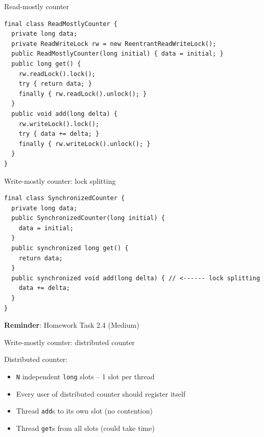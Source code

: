 \begin{frame}[fragile]{Read-mostly counter}

\begin{verbatim}
final class ReadMostlyCounter {
  private long data;
  private ReadWriteLock rw = new ReentrantReadWriteLock();
  public ReadMostlyCounter(long initial) { data = initial; }
  public long get() { 
    rw.readLock().lock();
    try { return data; } 
    finally { rw.readLock().unlock(); }
  }
  public void add(long delta) { 
    rw.writeLock().lock();
    try { data += delta; } 
    finally { rw.writeLock().unlock(); }
  }
}
\end{verbatim}
\end{frame}

\begin{frame}[fragile]{Write-mostly counter: lock splitting}

\begin{verbatim}
final class SynchronizedCounter {
  private long data;
  public SynchronizedCounter(long initial) { 
    data = initial; 
  }
  public synchronized long get() { 
    return data; 
  }
  public synchronized void add(long delta) { // <------ lock splitting
    data += delta; 
  }
}
\end{verbatim}

\textbf{Reminder}: Homework Task 2.4 (Medium)
\end{frame}

\begin{frame}[t,fragile]{Write-mostly counter: distributed counter}

Distributed counter:
\begin{itemize}
    \item \texttt{N} independent \texttt{long} slots -- 1 slot per thread
    \item Every user of distributed counter should register itself
    \item Thread \texttt{add}s to its own slot (no contention)
    \item Thread \texttt{get}s from all slots (could take time)
\end{itemize}
\end{frame}


